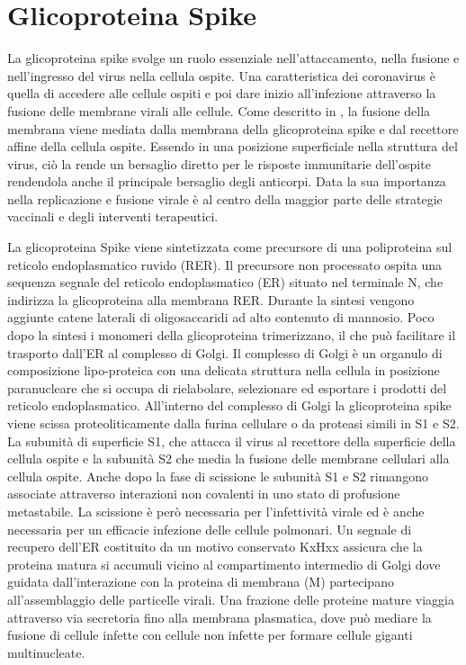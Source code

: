 \section{Glicoproteina Spike}\label{sec:glicoproteina}
La glicoproteina spike svolge un ruolo essenziale nell'attaccamento, nella fusione e nell'ingresso del virus nella cellula ospite. Una caratteristica dei coronavirus è quella di accedere alle cellule ospiti e poi dare inizio all'infezione attraverso la fusione delle membrane virali alle cellule. Come descritto in \cite{GlicoproteinaSpike}, la fusione della membrana viene mediata dalla membrana della glicoproteina spike e dal recettore affine della cellula ospite. Essendo in una posizione superficiale nella struttura del virus, ciò la rende un bersaglio diretto per le risposte immunitarie dell'ospite rendendola anche il principale bersaglio degli anticorpi. Data la sua importanza nella replicazione e fusione virale è al centro della maggior parte delle strategie vaccinali e degli interventi terapeutici. 

La glicoproteina Spike viene sintetizzata come precursore di una poliproteina sul reticolo endoplasmatico ruvido (RER). Il precursore non processato ospita una sequenza segnale del reticolo endoplasmatico (ER) situato nel terminale N, che indirizza la glicoproteina alla membrana RER. Durante la sintesi vengono aggiunte catene laterali di oligosaccaridi ad alto contenuto di mannosio. Poco dopo la sintesi i monomeri della glicoproteina trimerizzano, il che può facilitare il trasporto dall'ER al complesso di Golgi. Il complesso di Golgi è un organulo di composizione lipo-proteica con una delicata struttura nella cellula in posizione paranucleare che si occupa di rielabolare, selezionare ed esportare i prodotti del reticolo endoplasmatico. All'interno del complesso di Golgi la glicoproteina spike viene scissa proteoliticamente dalla furina cellulare o da proteasi simili in S1 e S2. La subunità di superficie S1, che attacca il virus al recettore della superficie della cellula ospite e la subunità S2 che media la fusione delle membrane cellulari alla cellula ospite. Anche dopo la fase di scissione le subunità S1 e S2 rimangono associate attraverso interazioni non covalenti in uno stato di profusione metastabile. La scissione è però necessaria per l'infettività virale ed è anche necessaria per un efficacie infezione delle cellule polmonari. Un segnale di recupero dell'ER costituito da un motivo conservato KxHxx assicura che la proteina matura si accumuli vicino al compartimento intermedio di Golgi dove guidata dall'interazione con la proteina di membrana (M) partecipano all'assemblaggio delle particelle virali. Una frazione delle proteine mature viaggia attraverso via secretoria fino alla membrana plasmatica, dove può mediare la fusione di cellule infette con cellule non infette per formare cellule giganti multinucleate.

